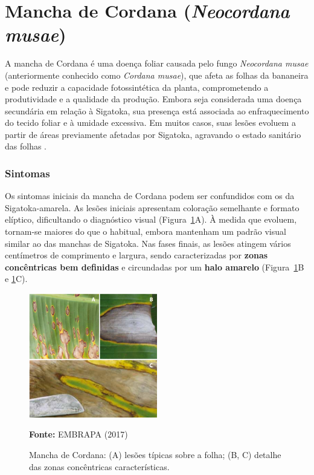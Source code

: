 \section{Mancha de Cordana (\textit{Neocordana musae})}

A mancha de Cordana é uma doença foliar causada pelo fungo \textit{Neocordana musae} (anteriormente conhecido como \textit{Cordana musae}), que afeta as folhas da bananeira e pode reduzir a capacidade fotossintética da planta, comprometendo a produtividade e a qualidade da produção. Embora seja considerada uma doença secundária em relação à Sigatoka, sua presença está associada ao enfraquecimento do tecido foliar e à umidade excessiva. Em muitos casos, suas lesões evoluem a partir de áreas previamente afetadas por Sigatoka, agravando o estado sanitário das folhas \cite{embrapa2017, pereira2020}.

\subsubsection*{Sintomas}

Os sintomas iniciais da mancha de Cordana podem ser confundidos com os da Sigatoka-amarela. As lesões iniciais apresentam coloração semelhante e formato elíptico, dificultando o diagnóstico visual (Figura~\ref{fig:cordana}A). À medida que evoluem, tornam-se maiores do que o habitual, embora mantenham um padrão visual similar ao das manchas de Sigatoka. Nas fases finais, as lesões atingem vários centímetros de comprimento e largura, sendo caracterizadas por \textbf{zonas concêntricas bem definidas} e circundadas por um \textbf{halo amarelo} (Figura~\ref{fig:cordana}B e \ref{fig:cordana}C).

\begin{figure}[h]
    \centering
    \includegraphics[width=0.5\textwidth]{figuras/capitulo 3/cardana.png}
    \caption{Mancha de Cordana: (A) lesões típicas sobre a folha; (B, C) detalhe das zonas concêntricas características.}
    \label{fig:cordana}
    \small{\textbf{Fonte:} EMBRAPA (2017)}
\end{figure}

